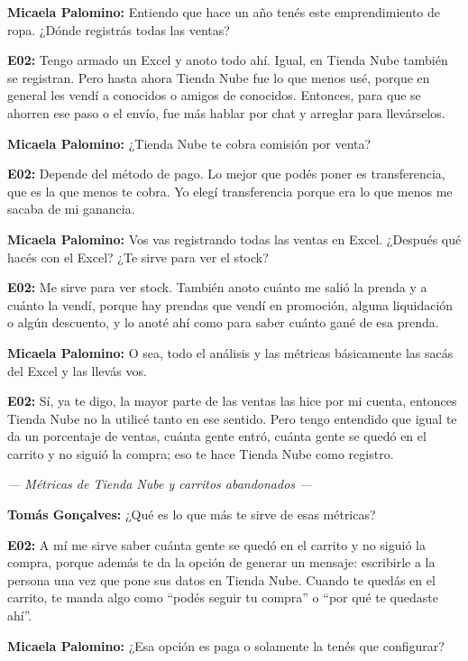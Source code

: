 \noindent\textbf{Micaela Palomino:} Entiendo que hace un año tenés este emprendimiento de ropa. ¿Dónde registrás todas las ventas?

\noindent\textbf{E02:} Tengo armado un Excel y anoto todo ahí. Igual, en Tienda Nube también se registran. Pero hasta ahora Tienda Nube fue lo que menos usé, porque en general les vendí a conocidos o amigos de conocidos. Entonces, para que se ahorren ese paso o el envío, fue más hablar por chat y arreglar para llevárselos.

\noindent\textbf{Micaela Palomino:} ¿Tienda Nube te cobra comisión por venta?

\noindent\textbf{E02:} Depende del método de pago. Lo mejor que podés poner es transferencia, que es la que menos te cobra. Yo elegí transferencia porque era lo que menos me sacaba de mi ganancia.

\noindent\textbf{Micaela Palomino:} Vos vas registrando todas las ventas en Excel. ¿Después qué hacés con el Excel? ¿Te sirve para ver el stock?

\noindent\textbf{E02:} Me sirve para ver stock. También anoto cuánto me salió la prenda y a cuánto la vendí, porque hay prendas que vendí en promoción, alguna liquidación o algún descuento, y lo anoté ahí como para saber cuánto gané de esa prenda.

\noindent\textbf{Micaela Palomino:} O sea, todo el análisis y las métricas básicamente las sacás del Excel y las llevás vos.

\noindent\textbf{E02:} Sí, ya te digo, la mayor parte de las ventas las hice por mi cuenta, entonces Tienda Nube no la utilicé tanto en ese sentido. Pero tengo entendido que igual te da un porcentaje de ventas, cuánta gente entró, cuánta gente se quedó en el carrito y no siguió la compra; eso te hace Tienda Nube como registro.

\noindent\textit{--- Métricas de Tienda Nube y carritos abandonados ---}

\noindent\textbf{Tomás Gonçalves:} ¿Qué es lo que más te sirve de esas métricas?

\noindent\textbf{E02:} A mí me sirve saber cuánta gente se quedó en el carrito y no siguió la compra, porque además te da la opción de generar un mensaje: escribirle a la persona una vez que pone sus datos en Tienda Nube. Cuando te quedás en el carrito, te manda algo como ``podés seguir tu compra'' o ``por qué te quedaste ahí''.

\noindent\textbf{Micaela Palomino:} ¿Esa opción es paga o solamente la tenés que configurar?

